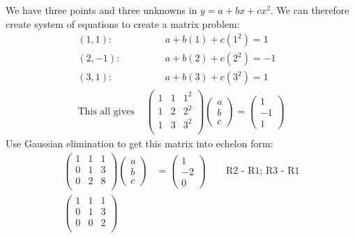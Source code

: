 \documentclass[12pts, answers]{exam}
\begin{document}
\begin{questions}
\begin{solution}
We have three points and three unknowns in $y = a + bx + cx^2$. We can therefore create system of equations to create a matrix problem:
%
\newcommand{\pxa}{1}
\newcommand{\pya}{1}
\newcommand{\pxb}{2}
\newcommand{\pyb}{-1}
\newcommand{\pxc}{3}
\newcommand{\pyc}{1}
\begin{align}
(\pxa,\pya): &\qquad a + b(\pxa) + c(\pxa^2) = \pya \nonumber \\
%
(\pxb,\pyb): &\qquad a + b(\pxb) + c(\pxb^2) = \pyb \nonumber \\
%
(\pxc,\pyc): &\qquad a + b(\pxc) + c(\pxc^2) = \pyc \nonumber \\
%
\text{This all gives } &\begin{pmatrix}
1 & \pxa & \pxa^2 \\
1 & \pxb & \pxb^2 \\
1 & \pxc & \pxc^2 \\
\end{pmatrix}
\begin{pmatrix} a \\ b \\ c \end{pmatrix} =
\begin{pmatrix} \pya \\ \pyb \\ \pyc \end{pmatrix} \nonumber
\end{align}
%
Use Gaussian elimination to get this matrix into echelon form:
\begin{align}
\begin{pmatrix}
1 & \pxa & 1 \\
0 & 1 & 3 \\
0 & 2 & 8 \\
\end{pmatrix}
\begin{pmatrix} a \\ b \\ c \end{pmatrix} &=
\begin{pmatrix} \pya \\ -2 \\ 0 \end{pmatrix} \qquad \text{R2 - R1; R3 - R1}\nonumber \\
%
\begin{pmatrix}
1 & \pxa & 1 \\
0 & 1 & 3 \\
0 & 0 & 2 \\
\end{pmatrix}

\end{align}
\end{solution}
\end{questions}
\end{document}
